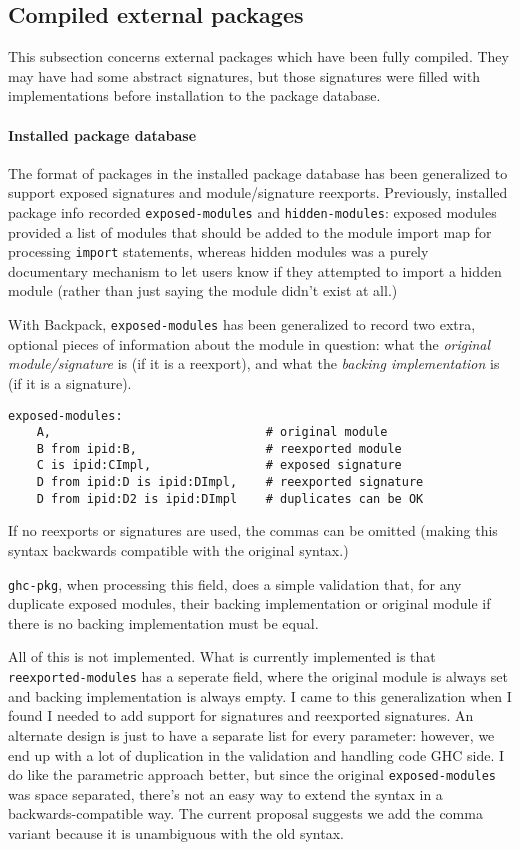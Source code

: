 \documentclass{article}
\newcommand{\Red}[1]{{\color{red} #1}}
\begin{document}
\subsection{Compiled external packages}

This subsection concerns external packages which have been fully compiled.
They may have had some abstract signatures, but those signatures were
filled with implementations before installation to the package database.

\paragraph{Installed package database}
The format of packages in the installed package database has been
generalized to support exposed signatures and module/signature
reexports.  Previously, installed package info recorded
\texttt{exposed-modules} and \texttt{hidden-modules}: exposed modules
provided a list of modules that should be added to the module import map
for processing \texttt{import} statements, whereas hidden modules was a
purely documentary mechanism to let users know if they attempted to
import a hidden module (rather than just saying the module didn't exist
at all.)

With Backpack, \texttt{exposed-modules} has been generalized to record
two extra, optional pieces of information about the module in question:
what the \emph{original module/signature} is (if it is a reexport), and
what the \emph{backing implementation} is (if it is a signature).

\begin{verbatim}
exposed-modules:
    A,                              # original module
    B from ipid:B,                  # reexported module
    C is ipid:CImpl,                # exposed signature
    D from ipid:D is ipid:DImpl,    # reexported signature
    D from ipid:D2 is ipid:DImpl    # duplicates can be OK
\end{verbatim}

If no reexports or signatures are used, the commas can be omitted
(making this syntax backwards compatible with the original syntax.)

\texttt{ghc-pkg}, when processing this field, does a simple validation
that, for any duplicate exposed modules, their backing implementation
or original module if there is no backing implementation must be equal.

\Red{All of this is not implemented.  What is currently implemented is
that \texttt{reexported-modules} has a seperate field, where the
original module is always set and backing implementation is always empty.
I came to this generalization when I found I needed to add support for
signatures and reexported signatures.  An alternate design is just to
have a separate list for every parameter: however, we end up with a lot
of duplication in the validation and handling code GHC side.  I do like
the parametric approach better, but since the original
\texttt{exposed-modules} was space separated, there's not an easy way to
extend the syntax in a backwards-compatible way.  The current proposal
suggests we add the comma variant because it is unambiguous with the old
syntax.}
\end{document}
